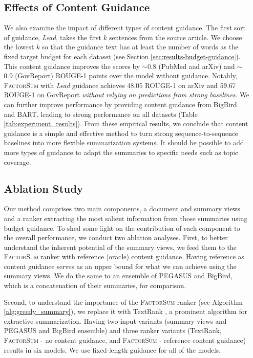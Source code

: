 \documentclass[11pt,table]{article}
\newcommand{\modelname}{FactorSum}
\begin{document}
\subsection{Effects of Content Guidance}
\label{sec:results_content_guidance}
We also examine the impact of different types of content guidance. The first sort of guidance, \emph{Lead}, takes the first $k$ sentences from the source article. We choose the lowest $k$ so that the guidance text has at least the number of words as the fixed target budget for each dataset (see Section \ref{sec:results-budget-guidance}). This content guidance improves the scores by $\sim$0.8 (PubMed and arXiv) and $\sim$0.9 (GovReport) ROUGE-1 points over the model without guidance. Notably, \textsc{\modelname} with \emph{Lead} guidance achieves 48.05 ROUGE-1 on arXiv and 59.67 ROUGE-1 on GovReport \emph{without relying on predictions from strong baselines}. We can further improve performance by providing content guidance from BigBird and BART, leading to strong performance on all datasets (Table \ref{tab:experiment_results}). From these empirical results, we conclude that content guidance is a simple and effective method to turn strong sequence-to-sequence baselines into more flexible summarization systems. It should be possible to add more types of guidance to adapt the summaries to specific needs such as topic coverage.

\subsection{Ablation Study}

Our method comprises two main components, a document and summary views and a ranker extracting the most salient information from those summaries using budget guidance. To shed some light on the contribution of each component to the overall performance, we conduct two ablation analyses. First, to better understand the inherent potential of the summary views, we feed them to the \textsc{\modelname} ranker with reference (oracle) content guidance. Having reference as content guidance serves as an upper bound  for what we can achieve using the summary views. We do the same to an ensemble of PEGASUS and BigBird, which is a concatenation of their summaries, for comparison.

Second, to understand the importance of the \textsc{\modelname} ranker (see Algorithm \ref{alg:greedy_summary}), we replace it with TextRank \cite{mihalcea2004textrank}, a prominent algorithm for extractive summarization. Having two input variants (summary views and PEGASUS and BigBird ensemble) and three ranker variants (TextRank, \textsc{\modelname} - no content guidance, and \textsc{\modelname} - reference content guidance) results in six models. We use fixed-length guidance for all of the models.
\end{document}
